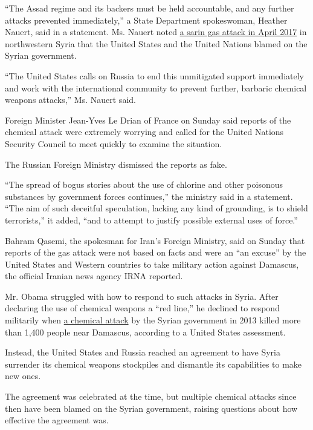 ``The Assad regime and its backers must be held accountable, and any
further attacks prevented immediately,'' a State Department spokeswoman,
Heather Nauert, said in a statement. Ms. Nauert noted
\href{https://www.nytimes.com/2017/04/04/world/middleeast/syria-gas-attack.html}{a
sarin gas attack in April 2017} in northwestern Syria that the United
States and the United Nations blamed on the Syrian government.

``The United States calls on Russia to end this unmitigated support
immediately and work with the international community to prevent
further, barbaric chemical weapons attacks,'' Ms. Nauert said.

Foreign Minister Jean-Yves Le Drian of France on Sunday said reports of
the chemical attack were extremely worrying and called for the United
Nations Security Council to meet quickly to examine the situation.

The Russian Foreign Ministry dismissed the reports as fake.

``The spread of bogus stories about the use of chlorine and other
poisonous substances by government forces continues,'' the ministry said
in a statement. ``The aim of such deceitful speculation, lacking any
kind of grounding, is to shield terrorists,'' it added, ``and to attempt
to justify possible external uses of force.''

Bahram Qasemi, the spokesman for Iran's Foreign Ministry, said on Sunday
that reports of the gas attack were not based on facts and were an ``an
excuse'' by the United States and Western countries to take military
action against Damascus, the official Iranian news agency IRNA reported.

Mr. Obama struggled with how to respond to such attacks in Syria. After
declaring the use of chemical weapons a ``red line,'' he declined to
respond militarily when
\href{http://www.nytimes.com/2013/08/27/world/middleeast/blasts-in-the-night-a-smell-and-a-flood-of-syrian-victims.html}{a
chemical attack} by the Syrian government in 2013 killed more than 1,400
people near Damascus, according to a United States assessment.

Instead, the United States and Russia reached an agreement to have Syria
surrender its chemical weapons stockpiles and dismantle its capabilities
to make new ones.

The agreement was celebrated at the time, but multiple chemical attacks
since then have been blamed on the Syrian government, raising questions
about how effective the agreement was.

